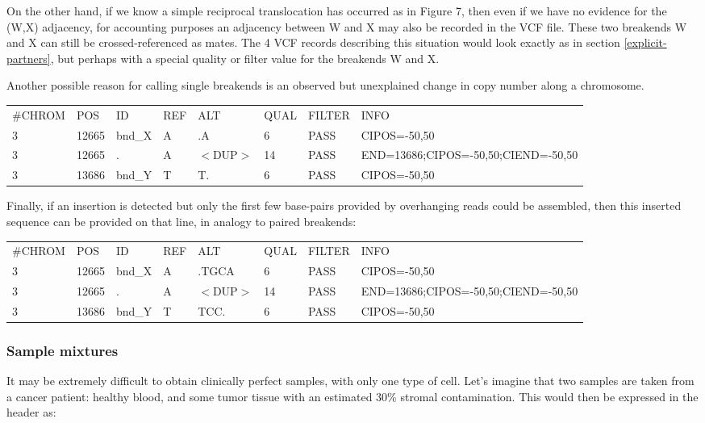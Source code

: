 \documentclass[8pt]{article}
\begin{document}
On the other hand, if we know a simple reciprocal translocation has occurred as in Figure 7, then even if we have no evidence for the (W,X) adjacency, for accounting purposes an adjacency between W and X may also be recorded in the VCF file.
These two breakends W and X can still be crossed-referenced as mates.
The 4 VCF records describing this situation would look exactly as in section \ref{explicit-partners}, but perhaps with a special quality or filter value for the breakends W and X.

Another possible reason for calling single breakends is an observed but unexplained change in copy number along a chromosome.

\vspace{0.3cm}
\scriptsize
\begin{tabular}{ l l l l l l l l }
\#CHROM & POS & ID & REF & ALT & QUAL & FILTER & INFO \\
3 & 12665 & bnd\_X & A & .A & 6 & PASS & CIPOS=-50,50 \\
3 & 12665 & . & A & $<$DUP$>$ & 14 & PASS & END=13686;CIPOS=-50,50;CIEND=-50,50 \\
3 & 13686 & bnd\_Y & T & T. & 6 & PASS & CIPOS=-50,50 \\
\end{tabular}
\normalsize
\vspace{0.3cm}

Finally, if an insertion is detected but only the first few base-pairs provided by overhanging reads could be assembled, then this inserted sequence can be provided on that line, in analogy to paired breakends:

\vspace{0.3cm}
\scriptsize
\begin{tabular}{ l l l l l l l l }
\#CHROM & POS & ID & REF & ALT & QUAL & FILTER & INFO \\
3 & 12665 & bnd\_X & A & .TGCA & 6 & PASS & CIPOS=-50,50 \\
3 & 12665 & . & A & $<$DUP$>$ & 14 & PASS & END=13686;CIPOS=-50,50;CIEND=-50,50 \\
3 & 13686 & bnd\_Y & T & TCC. & 6 & PASS & CIPOS=-50,50 \\
\end{tabular}
\normalsize

\subsubsection{Sample mixtures}
It may be extremely difficult to obtain clinically perfect samples, with only one type of cell.
Let's imagine that two samples are taken from a cancer patient: healthy blood, and some tumor tissue with an estimated 30\% stromal contamination.
This would then be expressed in the header as:
\end{document}
